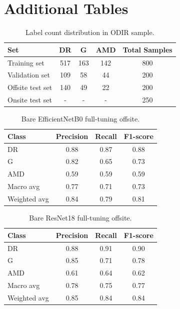 \documentclass{article}
\begin{document}
\clearpage
\vfill\pagebreak



\appendices

\section{Additional Tables}
\label{app:metrics}
\begin{table}[H]
\centering
\begin{tabular}{lcccc}
    \toprule
    \textbf{Set} & \textbf{DR} & \textbf{G} & \textbf{AMD} & \textbf{Total Samples}\\
    \midrule
    Training set & 517 & 163 & 142 & 800 \\
    Validation set & 109 & 58 & 44 & 200  \\
    Offsite test set & 140 & 49 & 22 & 200 \\
    Onsite test set & - & - & - & 250\\
    \bottomrule
\end{tabular}
\caption{Label count distribution in ODIR sample.}
\label{tab:data_distrib}
\end{table}



\begin{table}[H]
\centering
\begin{tabular}{lccc}
\toprule
\textbf{Class} & \textbf{Precision} & \textbf{Recall} & \textbf{F1-score} \\
\midrule
DR   & 0.88 & 0.87 & 0.88 \\
G    & 0.82 & 0.65 & 0.73 \\
AMD  & 0.59 & 0.59 & 0.59 \\
\midrule
Macro avg    & 0.77 & 0.71 & 0.73 \\
Weighted avg & 0.84 & 0.79 & 0.81 \\
\bottomrule
\end{tabular}
\caption{Bare EfficientNetB0 full-tuning offsite.}
\label{tab:efficient_full_task1}
\end{table}

\begin{table}[H]
\centering
\label{tab:resnet18_full_task1}
\begin{tabular}{lccc}
\toprule
\textbf{Class} & \textbf{Precision} & \textbf{Recall} & \textbf{F1-score} \\
\midrule
DR  & 0.88 & 0.91 & 0.90 \\
G   & 0.85 & 0.71 & 0.78 \\
AMD & 0.61 & 0.64 & 0.62 \\
\midrule
Macro avg    & 0.78 & 0.75 & 0.77 \\
Weighted avg & 0.85 & 0.84 & 0.84 \\
\bottomrule
\end{tabular}
\caption{Bare ResNet18 full-tuning offsite.}
\label{tab:resnet18_full_task1}
\end{table}
\end{document}
